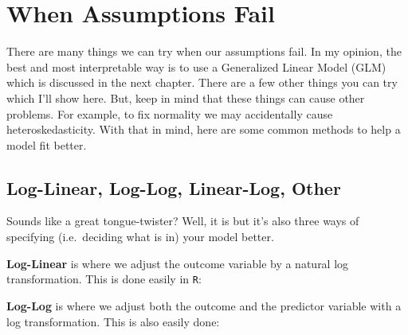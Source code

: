 \documentclass[]{tufte-book}
\newenvironment{Shaded}{}{}
\newcommand{\KeywordTok}[1]{\textcolor[rgb]{0.00,0.44,0.13}{\textbf{#1}}}
\newcommand{\DataTypeTok}[1]{\textcolor[rgb]{0.56,0.13,0.00}{#1}}
\newcommand{\StringTok}[1]{\textcolor[rgb]{0.25,0.44,0.63}{#1}}
\newcommand{\OperatorTok}[1]{\textcolor[rgb]{0.40,0.40,0.40}{#1}}
\newcommand{\NormalTok}[1]{#1}
\theoremstyle{definition}
\theoremstyle{definition}
\theoremstyle{remark}
\begin{document}
\section*{When Assumptions Fail}\label{when-assumptions-fail}

There are many things we can try when our assumptions fail. In my
opinion, the best and most interpretable way is to use a Generalized
Linear Model (GLM) which is discussed in the next chapter. There are a
few other things you can try which I'll show here. But, keep in mind
that these things can cause other problems. For example, to fix
normality we may accidentally cause heteroskedasticity. With that in
mind, here are some common methods to help a model fit better.

\subsection*{Log-Linear, Log-Log, Linear-Log,
Other}\label{log-linear-log-log-linear-log-other}

Sounds like a great tongue-twister? Well, it is but it's also three ways
of specifying (i.e.~deciding what is in) your model better.

\textbf{Log-Linear} is where we adjust the outcome variable by a natural
log transformation. This is done easily in \texttt{R}:

\begin{Shaded}
\end{Shaded}

\textbf{Log-Log} is where we adjust both the outcome and the predictor
variable with a log transformation. This is also easily done:

\begin{Shaded}
\end{Shaded}
\end{document}
